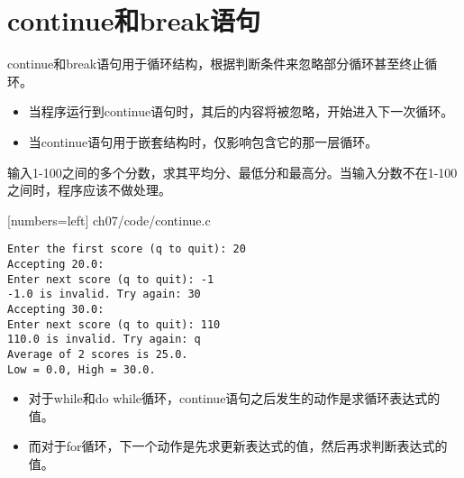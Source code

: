 \section{continue和break语句}
\begin{frame}[fragile]\ft{\secname}
continue和break语句用于循环结构，根据判断条件来忽略部分循环甚至终止循环。
\end{frame}


\begin{frame}[fragile]
\begin{itemize}
\item
当程序运行到continue语句时，其后的内容将被忽略，开始进入下一次循环。\\[0.1in]
\item
当continue语句用于嵌套结构时，仅影响包含它的那一层循环。
\end{itemize}
\end{frame}


\begin{frame}[fragile]
\begin{li}
输入1-100之间的多个分数，求其平均分、最低分和最高分。当输入分数不在1-100之间时，程序应该不做处理。
\end{li}

\end{frame}


\begin{frame}

[numbers=left]
{ch07/code/continue.c}
\end{frame}

\begin{frame}[fragile]
\begin{lstlisting}[backgroundcolor=\color{red!10}]
Enter the first score (q to quit): 20
Accepting 20.0:
Enter next score (q to quit): -1
-1.0 is invalid. Try again: 30
Accepting 30.0:
Enter next score (q to quit): 110
110.0 is invalid. Try again: q
Average of 2 scores is 25.0.
Low = 0.0, High = 30.0.
\end{lstlisting}

\end{frame}

\begin{frame}[fragile]
\begin{itemize}
\item 对于while和do while循环，continue语句之后发生的动作是求循环表达式的值。\\[0.1in]
\item 而对于for循环，下一个动作是先求更新表达式的值，然后再求判断表达式的值。
\end{itemize}

\end{frame}

